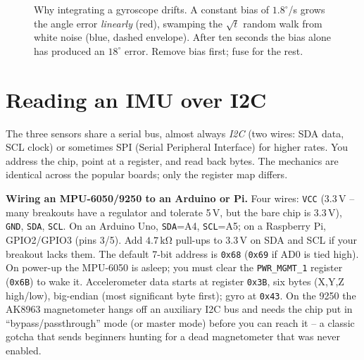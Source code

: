 \begin{figure}[H]
\centering
{}
\caption{Why integrating a gyroscope drifts. A constant bias of $1.8^\circ$/s grows
the angle error \emph{linearly} (red), swamping the $\sqrt{t}$ random walk from white
noise (blue, dashed envelope). After ten seconds the bias alone has produced an
$18^\circ$ error. Remove bias first; fuse for the rest.}
\label{ch34:fig-drift}
\end{figure}

\section{Reading an IMU over I2C}
\label{ch34:reading}

The three sensors share a serial bus, almost always \emph{I2C} (two wires: SDA data,
SCL clock) or sometimes SPI (Serial Peripheral Interface) for higher rates. You address the chip, point at a register,
and read back bytes. The mechanics are identical across the popular boards; only the
register map differs.

\begin{buildbox}
\textbf{Wiring an MPU-6050/9250 to an Arduino or Pi.} Four wires: \texttt{VCC}
(3.3\,V -- many breakouts have a regulator and tolerate 5\,V, but the bare chip is
3.3\,V), \texttt{GND}, \texttt{SDA}, \texttt{SCL}. On an Arduino Uno, \texttt{SDA}=A4,
\texttt{SCL}=A5; on a Raspberry Pi, GPIO2/GPIO3 (pins 3/5). Add $4.7\,\mathrm{k\Omega}$
pull-ups to 3.3\,V on SDA and SCL if your breakout lacks them. The default 7-bit
address is \texttt{0x68} (\texttt{0x69} if AD0 is tied high). \\[4pt]
On power-up the MPU-6050 is asleep; you must clear the \texttt{PWR\_MGMT\_1} register
(\texttt{0x6B}) to wake it. Accelerometer data starts at register \texttt{0x3B}, six
bytes (X,Y,Z high/low), big-endian (most significant byte first); gyro at \texttt{0x43}. On the 9250 the AK8963
magnetometer hangs off an auxiliary I2C bus and needs the chip put in
``bypass/passthrough'' mode (or master mode) before you can reach it -- a classic
gotcha that sends beginners hunting for a dead magnetometer that was never enabled.
\end{buildbox}

